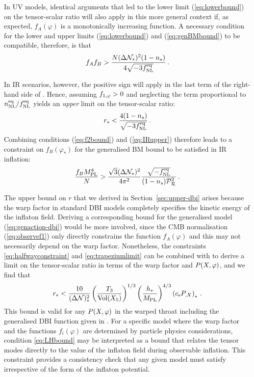 In UV models, identical arguments that led to 
the lower limit (\ref{eq:lowerbound}) on the tensor-scalar ratio
will also apply in this more general context if, as expected, $f_A (\varphi) $ 
is a monotonically increasing function. A necessary condition for
the lower and upper limits
(\ref{eq:lowerbound}) and (\ref{eq:genBMbound}) to be compatible, therefore, is  
that  
% 
\begin{equation}
\label{eq:evade}
f_Af_B > \frac{N (\Delta \mathcal{N}_*)^2 (1-n_s)}{4\sqrt{-3f_{\mathrm{NL}}^{\mathrm{eq}}}} \,.
\end{equation}
% 


In IR scenarios, however, the positive sign will apply in the 
last term of the right-hand side of .
Hence, assuming $f_{1,\varphi} >0$ and neglecting the term proportional to 
$n_{\mathrm{NL}}^{\mathrm{eq}}/f_{\mathrm{NL}}^{\mathrm{eq}}$ yields an {\em upper} limit on the tensor-scalar ratio:
% 
\begin{equation}
\label{eq:IRupper}
r_* < \frac{4(1-n_s)}{\sqrt{-3f_{\mathrm{NL}}^{\mathrm{eq}}}}  \,.
\end{equation}
% 
Combining conditions (\ref{eq:f2bound}) and (\ref{eq:IRupper}) 
therefore leads to a constraint on $f_B (\varphi_*) $
for the generalised BM bound to be satisfied in IR inflation: 
% 
\begin{equation}
\label{eq:f2IRlower}
\frac{f_BM_{\mathrm{PL}}^4}{N} > \frac{\sqrt{3} (\Delta \mathcal{N}_*)^2}{4\pi^2}
\frac{\sqrt{-f_{\mathrm{NL}}^{\mathrm{eq}}}}{(1-n_s)\mathcal{P}_{\mathcal{R}}^2 }  \,.
\end{equation}
% 

The upper bound on $r$ that we derived in Section~\ref{sec:upper-dbi} arises 
because the warp factor in standard DBI models 
completely specifies the kinetic 
energy of the inflaton field. Deriving a corresponding bound for 
the generalised model (\ref{eq:genaction-dbi}) would be more involved, 
since the CMB normalisation (\ref{eq:observef1}) only 
directly constrains the function 
$f_A (\varphi )$ and this may not necessarily depend on the warp factor. 
Nonetheless, the constraints \eqref{eq:halfwayconstraint} and
\eqref{eq:trapeziumlimit} can be 
combined with  to derive a limit 
on the tensor-scalar ratio in terms of the warp factor and $P(X,\varphi)$, and we find
that 
% 
\begin{equation}
\label{eq:LHbound}
r_* < \frac{10}{(\Delta \mathcal{N})_*^2} \left( \frac{T_3}{\mathrm{Vol} (X_5)} \right)^{1/3} 
\left( \frac{h_*}{M_{\mathrm{PL}}} \right)^{4/3} \left( c_\mathrm{s} P_{,X} \right)_* \,.
\end{equation}
% 
This bound is valid for any $P(X,\varphi)$ in the warped throat including the
generalised DBI function given in .
For a specific model where the warp factor and 
the functions $f_i (\varphi )$ are determined by particle 
physics considerations,   
condition \eqref{eq:LHbound} 
may be interpreted as a bound that relates 
the tensor modes directly to the value of the inflaton field during observable 
inflation. This constraint provides a consistency 
check that any given model must satisfy 
irrespective of the form of the inflaton potential. 
% 


